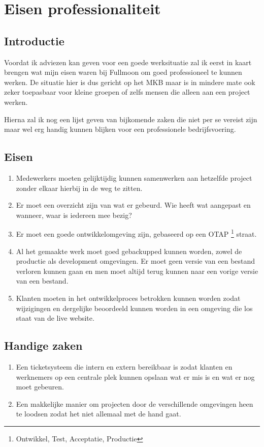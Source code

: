 \chapter{Eisen professionaliteit}

\section{Introductie}

Voordat ik adviezen kan geven voor een goede werksituatie zal ik eerst in kaart brengen wat mijn eisen waren bij Fullmoon om goed professioneel te kunnen werken. De situatie hier is dus gericht op het MKB maar is in mindere mate ook zeker toepasbaar voor kleine groepen of zelfs mensen die alleen aan een project werken.

Hierna zal ik nog een lijst geven van bijkomende zaken die niet per se vereist zijn maar wel erg handig kunnen blijken voor een professionele bedrijfsvoering.

\section{Eisen}

\begin{enumerate}
  \item Medewerkers moeten gelijktijdig kunnen samenwerken aan hetzelfde project zonder elkaar hierbij in de weg te zitten.
  \item Er moet een overzicht zijn van wat er gebeurd. Wie heeft wat aangepast en wanneer, waar is iedereen mee bezig?
  \item Er moet een goede ontwikkelomgeving zijn, gebaseerd op een OTAP \footnote{Ontwikkel, Test, Acceptatie, Productie} straat.
  \item Al het gemaakte werk moet goed gebackupped kunnen worden, zowel de productie als development omgevingen. Er moet geen versie van een bestand verloren kunnen gaan en men moet altijd terug kunnen naar een vorige versie van een bestand.
  \item Klanten moeten in het ontwikkelproces betrokken kunnen worden zodat wijzigingen en dergelijke beoordeeld kunnen worden in een omgeving die los staat van de live website.
\end{enumerate}

\section{Handige zaken}

\begin{enumerate}
  \item Een ticketsysteem die intern en extern bereikbaar is zodat klanten en werknemers op een centrale plek kunnen opslaan wat er mis is en wat er nog moet gebeuren.
  \item Een makkelijke manier om projecten door de verschillende omgevingen heen te loodsen zodat het niet allemaal met de hand gaat.
\end{enumerate}